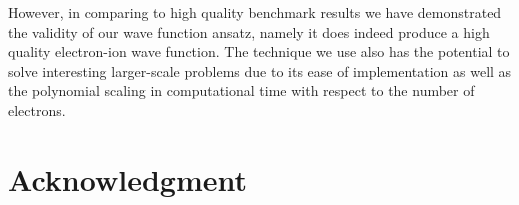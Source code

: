 \documentclass[pra,superscriptaddress,groupedaddress,twocolumn]{revtex4-1}
\begin{document}
However, in comparing to high quality benchmark results we have demonstrated the validity of our wave function ansatz, namely it does indeed produce a high quality electron-ion wave function. 
 The technique we use also has the potential to solve interesting larger-scale problems due to its ease of implementation as well as the polynomial scaling in computational time with respect to the number of electrons.  %

\section{Acknowledgment}



\end{document}
